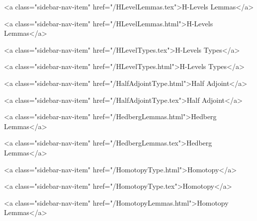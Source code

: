       
        
          <a class="sidebar-nav-item" href="/HLevelLemmas.tex">H-Levels Lemmas</a>
        
      
    
      
        
          <a class="sidebar-nav-item" href="/HLevelLemmas.html">H-Levels Lemmas</a>
        
      
    
      
        
          <a class="sidebar-nav-item" href="/HLevelTypes.tex">H-Levels Types</a>
        
      
    
      
        
          <a class="sidebar-nav-item" href="/HLevelTypes.html">H-Levels Types</a>
        
      
    
      
        
          <a class="sidebar-nav-item" href="/HalfAdjointType.html">Half Adjoint</a>
        
      
    
      
        
          <a class="sidebar-nav-item" href="/HalfAdjointType.tex">Half Adjoint</a>
        
      
    
      
        
          <a class="sidebar-nav-item" href="/HedbergLemmas.html">Hedberg Lemmas</a>
        
      
    
      
        
          <a class="sidebar-nav-item" href="/HedbergLemmas.tex">Hedberg Lemmas</a>
        
      
    
      
        
          <a class="sidebar-nav-item" href="/HomotopyType.html">Homotopy</a>
        
      
    
      
        
          <a class="sidebar-nav-item" href="/HomotopyType.tex">Homotopy</a>
        
      
    
      
        
          <a class="sidebar-nav-item" href="/HomotopyLemmas.html">Homotopy Lemmas</a>
        
      
    

